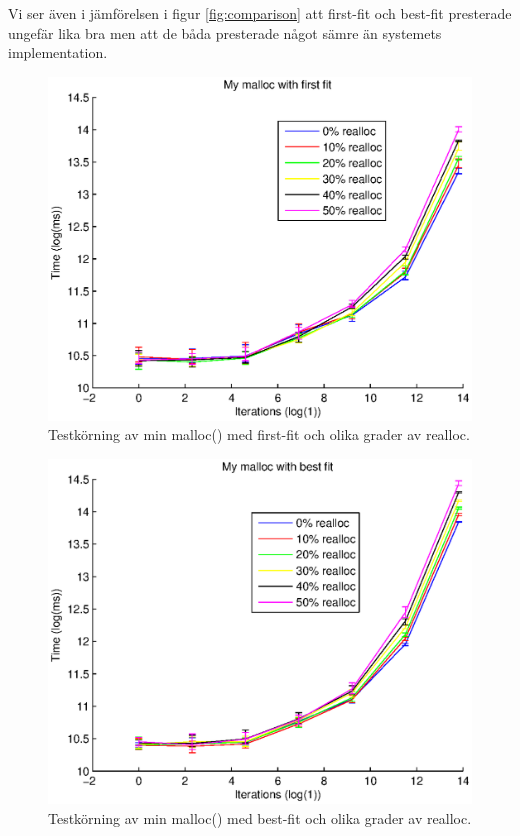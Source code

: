 \documentclass[10pt,a4paper]{article}
\begin{document}
Vi ser även i jämförelsen i figur \ref{fig:comparison} att first-fit och best-fit presterade ungefär lika bra men att de båda presterade något sämre än systemets implementation.

\clearpage

\begin{figure}
\includegraphics[scale=0.7]{../results/my1.eps}
\caption{Testkörning av min malloc() med first-fit och olika grader av realloc.}
\label{fig:my1}
\end{figure}

\begin{figure}
\includegraphics[scale=0.7]{../results/my2.eps}
\caption{Testkörning av min malloc() med best-fit och olika grader av realloc.}
\label{fig:my2}
\end{figure}
\end{document}
